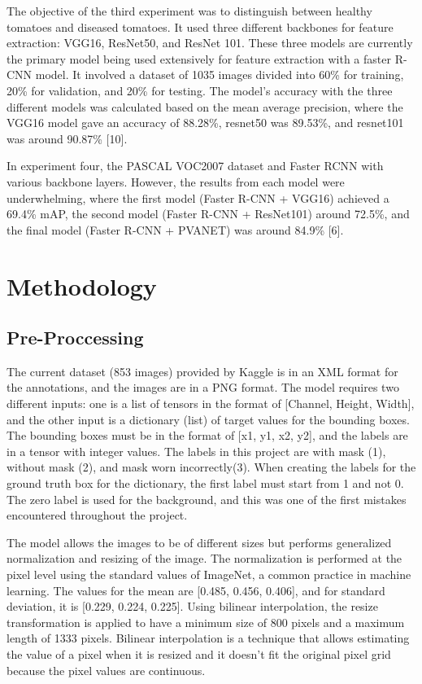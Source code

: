 \documentclass[conference]{IEEEtran}
\begin{document}
The objective of the third experiment was to distinguish between healthy tomatoes and diseased tomatoes. It used three different backbones for feature extraction: VGG16, 
ResNet50, and ResNet 101. These three models are currently the primary model being used extensively for feature extraction with a faster R-CNN model. It involved a dataset of 
1035 images divided into 60\% for training, 20\% for validation, and 20\% for testing. The model's accuracy with the three different models was calculated based on the 
mean average precision, where the VGG16 model gave an accuracy of 88.28\%, resnet50 was 89.53\%, and resnet101 was around 90.87\% [10]. 

In experiment four, the PASCAL VOC2007 dataset and Faster RCNN with various backbone layers. However, the results from each model were underwhelming, where the first model 
(Faster R-CNN + VGG16) achieved a 69.4\% mAP, the second model (Faster R-CNN + ResNet101) around 72.5\%, and the final model (Faster R-CNN + PVANET) was around 
84.9\% [6]. 

\section{Methodology}

\subsection{Pre-Proccessing}
The current dataset (853 images) provided by Kaggle is in an XML format for the annotations, and the images are in a PNG format. The model requires two different inputs: 
one is a list of tensors in the format of [Channel, Height, Width], and the other input is a dictionary (list) of target values for the bounding boxes. The bounding boxes 
must be in the format of [x1, y1, x2, y2], and the labels are in a tensor with integer values. The labels in this project are with mask (1), without mask (2), and 
mask worn incorrectly(3). 
When creating the labels for the ground truth box for the dictionary, the first label must start from 1 and not 0. The zero label is used for the background, and this was one 
of the first mistakes encountered throughout the project. 

The model allows the images to be of different sizes but performs 
generalized normalization and resizing of the image. The normalization is performed at the pixel level using the standard values of ImageNet, a common practice in machine learning. 
The values for the mean are [0.485, 0.456, 0.406], and for standard deviation, it is [0.229, 0.224, 0.225]. Using bilinear interpolation, the resize transformation is applied to 
have a minimum size of 800 pixels and a maximum length of 1333 pixels. Bilinear interpolation is a technique that allows estimating the value of a pixel when it is resized and it 
doesn’t fit the original pixel grid because the pixel values are continuous.  
\end{document}
